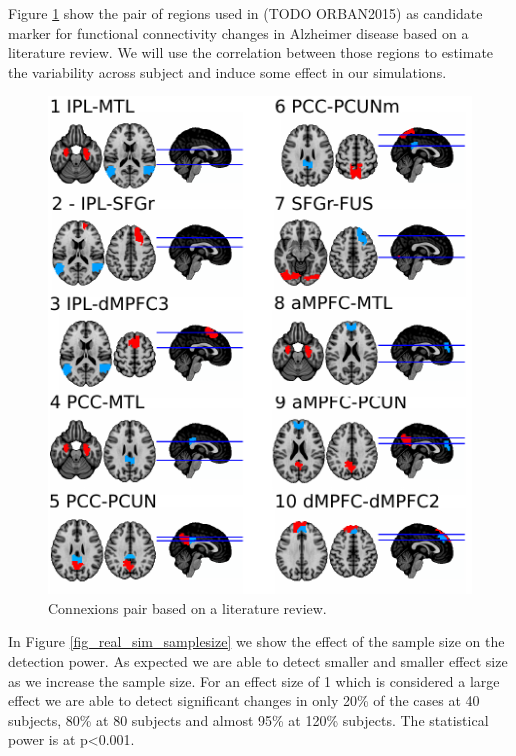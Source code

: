 \documentclass[authoryear]{elsarticle}
\begin{document}
Figure \ref{fig_p2p} show the pair of regions used in (TODO ORBAN2015) as candidate marker for functional connectivity changes in Alzheimer disease based on a literature review. We will use the correlation between those regions to estimate the variability across subject and induce some effect in our simulations.

\begin{figure}[tbp]
\begin{center}
\includegraphics[width=0.5\linewidth]{../figures/p2p_seeds.pdf}
\end{center}
\caption{
Connexions pair based on a literature review.
}
\label{fig_p2p}
\end{figure}


In Figure \ref{fig_real_sim_samplesize} we show the effect of the sample size on the detection power. As expected we are able to detect smaller and smaller effect size as we increase the sample size. For an effect size of 1 which is considered a large effect we are able to detect significant changes in only 20\% of the cases at 40 subjects, 80\% at 80 subjects and almost 95\% at 120\% subjects. The statistical power is at p<0.001.
\end{document}
